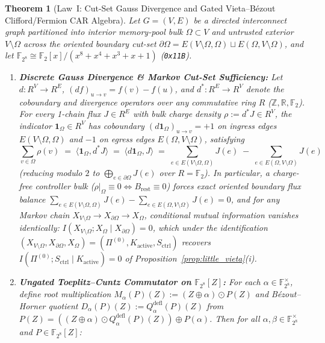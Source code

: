 \documentclass[11pt,letterpaper]{article}
\theoremstyle{spectralthm}
\newtheorem{theorem}{Theorem}[section]
\begin{document}
\begin{theorem}[Law~I: Cut-Set Gauss Divergence and Gated Vieta--B\'{e}zout Clifford/Fermion CAR Algebra]
\label{thm:law1_gauss_car}
Let $G=(V,E)$ be a directed interconnect graph partitioned into interior memory-pool bulk $\Omega\subset V$ and untrusted exterior $V\setminus\Omega$ across the oriented boundary cut-set $\partial\Omega = E(V\setminus\Omega, \Omega) \sqcup E(\Omega, V\setminus\Omega)$, and let $\mathbb{F}_{2^8}\cong\mathbb{F}_2[x]/(x^8+x^4+x^3+x+1)$ (\texttt{0x11B}).
\begin{enumerate}
\item \textbf{Discrete Gauss Divergence \& Markov Cut-Set Sufficiency:} Let $d : R^V \to R^E$, $(df)_{u\to v} = f(v) - f(u)$, and $d^* : R^E \to R^V$ denote the coboundary and divergence operators over any commutative ring $R$ ($\mathbb{Z}, \mathbb{R}, \mathbb{F}_2$). For every 1-chain flux $J \in R^E$ with bulk charge density $\rho := d^* J \in R^V$, the indicator $\mathbf{1}_\Omega \in R^V$ has coboundary $(d\mathbf{1}_\Omega)_{u\to v} = +1$ on ingress edges $E(V\setminus\Omega,\Omega)$ and $-1$ on egress edges $E(\Omega,V\setminus\Omega)$, satisfying
\begin{equation}
\label{eq:law1_gauss_div}
\sum_{v \in \Omega} \rho(v) \;=\; \langle \mathbf{1}_\Omega, d^* J \rangle \;=\; \langle d\mathbf{1}_\Omega, J \rangle \;=\; \sum_{e \in E(V\setminus\Omega,\Omega)} J(e) \;-\; \sum_{e \in E(\Omega,V\setminus\Omega)} J(e)
\end{equation}
(reducing modulo $2$ to $\bigoplus_{e\in\partial\Omega}J(e)$ over $R = \mathbb{F}_2$). In particular, a charge-free controller bulk ($\rho|_{\Omega} \equiv 0 \iff B_{\mathrm{rest}} \equiv 0$) forces exact oriented boundary flux balance $\sum_{e \in E(V\setminus\Omega,\Omega)} J(e) - \sum_{e \in E(\Omega,V\setminus\Omega)} J(e) = 0$, and for any Markov chain $X_{V\setminus\Omega} \to X_{\partial\Omega} \to X_\Omega$, conditional mutual information vanishes identically: $I(X_{V\setminus\Omega}; X_\Omega \mid X_{\partial\Omega}) = 0$, which under the identification $(X_{V\setminus\Omega}, X_{\partial\Omega}, X_\Omega) = (\Pi^{(0)}, K_{\mathrm{active}}, S_{\mathrm{ctrl}})$ recovers $I(\Pi^{(0)}; S_{\mathrm{ctrl}} \mid K_{\mathrm{active}}) = 0$ of Proposition~\ref{prop:little_vieta}(i).
\item \textbf{Ungated Toeplitz--Cuntz Commutator on $\mathbb{F}_{2^8}[Z]$:} For each $\alpha \in \mathbb{F}_{2^8}^\times$, define root multiplication $M_\alpha(P)(Z) := (Z \oplus \alpha) \odot P(Z)$ and B\'{e}zout--Horner quotient $D_\alpha(P)(Z) := Q^{\mathrm{defl}}_\alpha(P)(Z)$ from $P(Z) = ((Z \oplus \alpha)\odot Q^{\mathrm{defl}}_\alpha(P)(Z)) \oplus P(\alpha)$. Then for all $\alpha, \beta \in \mathbb{F}_{2^8}^\times$ and $P \in \mathbb{F}_{2^8}[Z]$:

\end{enumerate}
\end{theorem}
\end{document}
